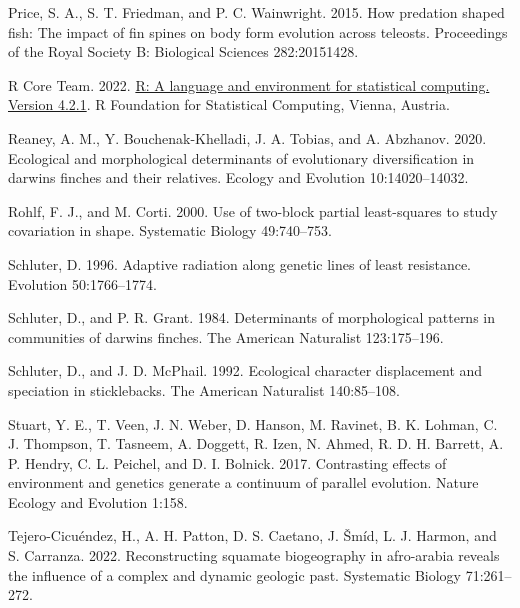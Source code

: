 \documentclass[
  11pt,
]{article}
\newlength{\cslhangindent}
\newlength{\cslentryspacingunit} %
\newenvironment{CSLReferences}[2] %
 {%
  \setlength{\parindent}{0pt}
  \ifodd #1
  \let\oldpar\par
  \def\par{\hangindent=\cslhangindent\oldpar}
  \fi
  \setlength{\parskip}{#2\cslentryspacingunit}
 }%
 {}
\begin{document}
\begin{CSLReferences}{1}{0}
\leavevmode{}%
Price, S. A., S. T. Friedman, and P. C. Wainwright. 2015. How predation
shaped fish: The impact of fin spines on body form evolution across
teleosts. Proceedings of the Royal Society B: Biological Sciences
282:20151428.

\leavevmode{}%
R Core Team. 2022. \href{https://www.R-project.org/}{R: A language and
environment for statistical computing. Version 4.2.1}. R Foundation for
Statistical Computing, Vienna, Austria.

\leavevmode{}%
Reaney, A. M., Y. Bouchenak-Khelladi, J. A. Tobias, and A. Abzhanov.
2020. Ecological and morphological determinants of evolutionary
diversification in darwin{\textquotesingle}s finches and their
relatives. Ecology and Evolution 10:14020--14032.

\leavevmode{}%
Rohlf, F. J., and M. Corti. 2000. Use of two-block partial least-squares
to study covariation in shape. Systematic Biology 49:740--753.

\leavevmode{}%
Schluter, D. 1996. Adaptive radiation along genetic lines of least
resistance. Evolution 50:1766--1774.

\leavevmode{}%
Schluter, D., and P. R. Grant. 1984. Determinants of morphological
patterns in communities of darwin{\textquotesingle}s finches. The
American Naturalist 123:175--196.

\leavevmode{}%
Schluter, D., and J. D. McPhail. 1992. Ecological character displacement
and speciation in sticklebacks. The American Naturalist 140:85--108.

\leavevmode{}%
Stuart, Y. E., T. Veen, J. N. Weber, D. Hanson, M. Ravinet, B. K.
Lohman, C. J. Thompson, T. Tasneem, A. Doggett, R. Izen, N. Ahmed, R. D.
H. Barrett, A. P. Hendry, C. L. Peichel, and D. I. Bolnick. 2017.
Contrasting effects of environment and genetics generate a continuum of
parallel evolution. Nature Ecology and Evolution 1:158.

\leavevmode{}%
Tejero-Cicuéndez, H., A. H. Patton, D. S. Caetano, J. Šmíd, L. J.
Harmon, and S. Carranza. 2022. Reconstructing squamate biogeography in
afro-arabia reveals the influence of a complex and dynamic geologic
past. Systematic Biology 71:261--272.


\end{CSLReferences}
\end{document}
